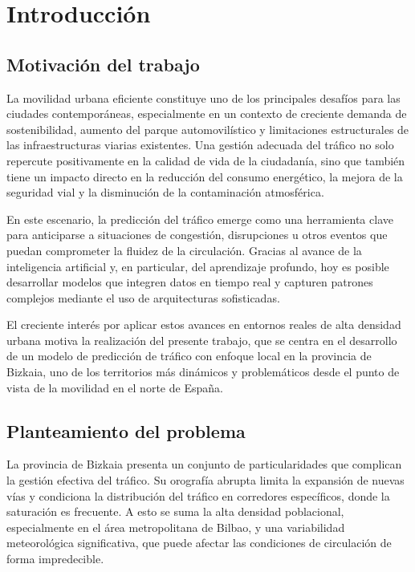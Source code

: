 \section{Introducción}

\subsection{Motivación del trabajo}

La movilidad urbana eficiente constituye uno de los principales desafíos para las ciudades contemporáneas, especialmente en un contexto de creciente demanda de sostenibilidad, aumento del parque automovilístico y limitaciones estructurales de las infraestructuras viarias existentes. Una gestión adecuada del tráfico no solo repercute positivamente en la calidad de vida de la ciudadanía, sino que también tiene un impacto directo en la reducción del consumo energético, la mejora de la seguridad vial y la disminución de la contaminación atmosférica.

En este escenario, la predicción del tráfico emerge como una herramienta clave para anticiparse a situaciones de congestión, disrupciones u otros eventos que puedan comprometer la fluidez de la circulación. Gracias al avance de la inteligencia artificial y, en particular, del aprendizaje profundo, hoy es posible desarrollar modelos que integren datos en tiempo real y capturen patrones complejos mediante el uso de arquitecturas sofisticadas.

El creciente interés por aplicar estos avances en entornos reales de alta densidad urbana motiva la realización del presente trabajo, que se centra en el desarrollo de un modelo de predicción de tráfico con enfoque local en la provincia de Bizkaia, uno de los territorios más dinámicos y problemáticos desde el punto de vista de la movilidad en el norte de España.

\subsection{Planteamiento del problema}

La provincia de Bizkaia presenta un conjunto de particularidades que complican la gestión efectiva del tráfico. Su orografía abrupta limita la expansión de nuevas vías y condiciona la distribución del tráfico en corredores específicos, donde la saturación es frecuente. A esto se suma la alta densidad poblacional, especialmente en el área metropolitana de Bilbao, y una variabilidad meteorológica significativa, que puede afectar las condiciones de circulación de forma impredecible.

